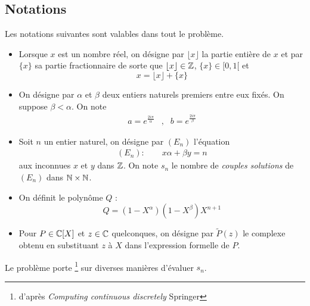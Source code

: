 \subsection*{Notations}
Les notations suivantes sont valables dans tout le problème.
\begin{itemize}
 \item Lorsque $x$ est un nombre réel, on désigne par $\lfloor x \rfloor$ la partie entière de $x$ et par $\{ x \}$ sa partie fractionnaire de sorte que $\lfloor x \rfloor \in \mathbb{Z}$, $\{ x \}\in[0,1[$ et
\begin{displaymath}
 x= \lfloor x \rfloor + \{ x \}
\end{displaymath}

\item On désigne par $\alpha$ et $\beta$ deux entiers naturels premiers entre eux fixés. On suppose $\beta <\alpha$. On note
\begin{align*}
 a=e^{\frac{2i\pi}{\alpha}} &,& b=e^{\frac{2i\pi}{\beta}}
\end{align*}
\item Soit $n$ un entier naturel, on  désigne par $(E_n)$ l'équation
\begin{align*}
 (E_n) : \qquad x\alpha + \beta y = n
\end{align*}
aux inconnues $x$ et $y$ dans $\mathbb{Z}$.
\newline On note $s_n$ le nombre de \emph{couples solutions} de $(E_n)$ dans $\mathbb{N} \times \mathbb{N}$.

\item On définit le polynôme $Q$ :
\begin{displaymath}
 Q = (1-X^\alpha)(1-X^\beta)X^{n+1} 
\end{displaymath}

\item Pour $P\in \mathbb{C}[X]$ et $z\in \mathbb{C}$ quelconques, on désigne par $\widetilde{P}(z)$ le complexe obtenu en substituant $z$ à $X$ dans l'expression formelle de $P$.
\end{itemize}
Le problème porte \footnote{ d'après \emph{Computing continuous discretely} Springer} sur diverses manières d'évaluer $s_n$.

